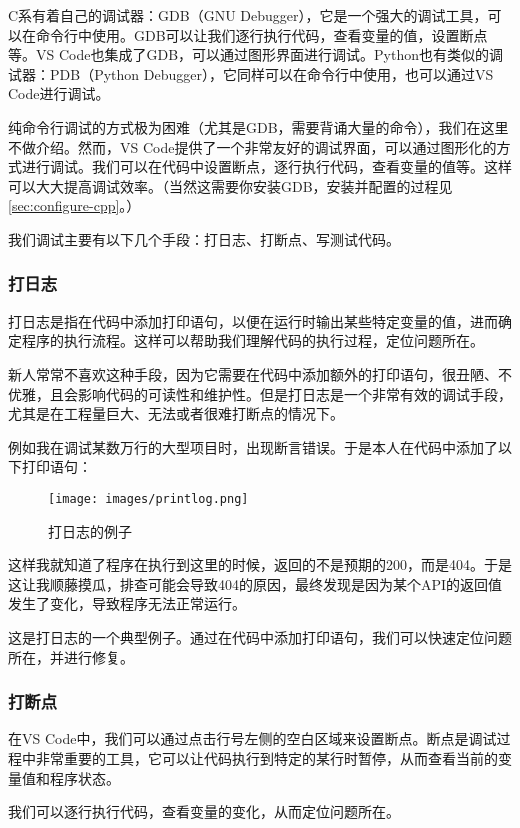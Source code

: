 \documentclass[../main.tex]{subfiles}
\begin{document}
C系有着自己的调试器：GDB（GNU Debugger），它是一个强大的调试工具，可以在命令行中使用。GDB可以让我们逐行执行代码，查看变量的值，设置断点等。VS Code也集成了GDB，可以通过图形界面进行调试。Python也有类似的调试器：PDB（Python Debugger），它同样可以在命令行中使用，也可以通过VS Code进行调试。

纯命令行调试的方式极为困难（尤其是GDB，需要背诵大量的命令），我们在这里不做介绍。然而，VS Code提供了一个非常友好的调试界面，可以通过图形化的方式进行调试。我们可以在代码中设置断点，逐行执行代码，查看变量的值等。这样可以大大提高调试效率。（当然这需要你安装GDB，安装并配置的过程见\ref{sec:configure-cpp}。）

我们调试主要有以下几个手段：打日志、打断点、写测试代码。

\subsubsection{打日志}

打日志是指在代码中添加打印语句，以便在运行时输出某些特定变量的值，进而确定程序的执行流程。这样可以帮助我们理解代码的执行过程，定位问题所在。

新人常常不喜欢这种手段，因为它需要在代码中添加额外的打印语句，很丑陋、不优雅，且会影响代码的可读性和维护性。但是打日志是一个非常有效的调试手段，尤其是在工程量巨大、无法或者很难打断点的情况下。

例如我在调试某数万行的大型项目时，出现断言错误。于是本人在代码中添加了以下打印语句：

\begin{figure}[ht]
  \centering
  \texttt{[image: images/printlog.png]}
  \caption{打日志的例子}
\end{figure}

这样我就知道了程序在执行到这里的时候，返回的不是预期的200，而是404。于是这让我顺藤摸瓜，排查可能会导致404的原因，最终发现是因为某个API的返回值发生了变化，导致程序无法正常运行。

这是打日志的一个典型例子。通过在代码中添加打印语句，我们可以快速定位问题所在，并进行修复。

\subsubsection{打断点}

在VS Code中，我们可以通过点击行号左侧的空白区域来设置断点。断点是调试过程中非常重要的工具，它可以让代码执行到特定的某行时暂停，从而查看当前的变量值和程序状态。

我们可以逐行执行代码，查看变量的变化，从而定位问题所在。
\end{document}
